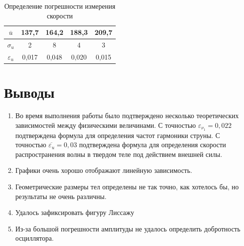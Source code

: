 \documentclass[13pt,a4paper]{article}
\begin{document}
\begin{minipage}[h]{2\textwidth}

\end{minipage}

\begin{table}[h]
\centering
\begin{tabular}{|c|c|c|c|c|}
\hline
$\overline{u}$  & 137,7 & 164,2 & 188,3 & 209,7 \\ \hline
$\sigma_{u}$     & 2   & 8   & 4   & 3  \\ \hline
$\varepsilon_{u}$   & 0,017 & 0,048 & 0,020 & 0,015\\ \hline
\end{tabular}
\caption{Определение погрешности измерения скорости}
\label{tab:velocity_with_mistakes}
\end{table}
\section{Выводы}
\begin{enumerate}
\item Во время выполнения работы было подтверждено несколько теоретических зависимостей между физическими величинами. С точностью $\varepsilon_{\nu_{1}} = 0,022$ подтверждена формула для определения частот гармоники струны. С точностью  $\overline{\varepsilon_{u}} = 0,03$ подтверждена формула для определения скорости распространения волны в твердом теле под действием внешней силы.
\item Графики очень хорошо отображают линейную зависимость.
\item Геометрические размеры тел определены не так точно, как хотелось бы, но результаты не очень различны.
\item Удалось зафиксировать фигуру Лиссажу 
\item Из-за большой погрешности амплитуды не удалось определить добротность осциллятора. 
\end{enumerate}	
\end{document}
